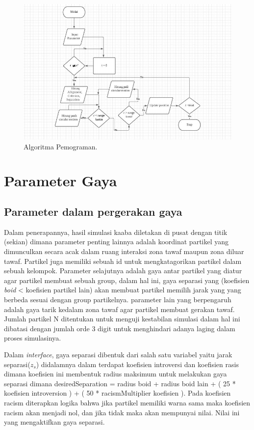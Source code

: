 \begin{figure}
\centering
\includegraphics[scale=0.5]{gambar/diagram} %
\caption{Algoritma Pemograman.}
\end{figure}

\section{Parameter Gaya}
\subsection{Parameter dalam pergerakan gaya}
\hspace{0.6cm}Dalam penerapannya, hasil simulasi kaaba diletakan di pusat dengan titik (sekian) dimana parameter penting lainnya adalah koordinat partikel yang dimunculkan secara acak dalam ruang interaksi zona tawaf maupun zona diluar tawaf. Partikel juga memiliki sebuah id untuk mengkatagorikan partikel dalam sebuah kelompok. Parameter selajutnya adalah gaya antar partikel yang diatur agar partikel membuat sebuah group, dalam hal ini, gaya separasi yang (koefisien \emph{boid} < koefisien partikel lain) akan membuat partikel memilih jarak yang yang berbeda sesuai dengan group partikelnya. parameter lain yang berpengaruh adalah gaya tarik kedalam zona tawaf agar partikel membuat gerakan tawaf. Jumlah partikel N ditentukan untuk menguji kestabilan simulasi dalam hal ini dibatasi dengan jumlah orde 3 digit untuk menghindari adanya laging dalam proses simulasinya.

Dalam \emph{interface}, gaya separasi dibentuk dari salah satu variabel yaitu jarak separasi($z_s$) didalamnya dalam  terdapat koefisien introversi dan koefisien rasis dimana koefisien ini membentuk radius maksimum untuk melakukan gaya separasi dimana desiredSeparation = radius boid + radius boid lain + ( 25 * koefisien introversion ) + ( 50 * racismMultiplier koefisien ). Pada koefisien racism diterapkan logika bahwa jika partikel memiliki warna sama maka koefisien racism akan menjadi nol, dan jika tidak maka akan mempunyai nilai. Nilai ini yang mengaktifkan gaya separasi.

